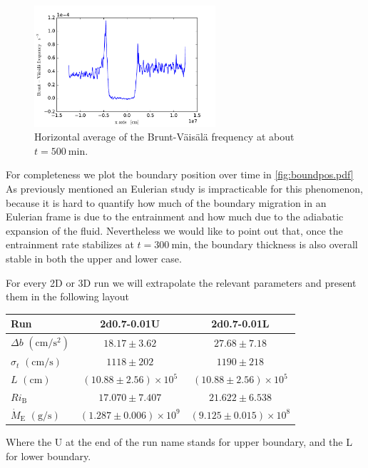  \begin{figure}[t!]
\centering
\includegraphics[width=0.6\textwidth]{./img/brunt}
\caption{Horizontal average of the Brunt-Väisälä frequency at about $t=500 \ \mathrm{min}$.}
\label{fig:brunt}
\centering
\end{figure}
For completeness we plot the boundary position over time in \ref{fig:boundpos.pdf} As previously mentioned an Eulerian study is impracticable for this phenomenon, because it is hard to quantify how much of the boundary migration in an Eulerian frame is due to the entrainment and how much due to the adiabatic expansion of the fluid. Nevertheless we would like to point out that, once the entrainment rate stabilizes at $t=300 \ \mathrm{min}$, the boundary thickness is also overall stable in both the upper and lower case. 

For every 2D or 3D run we will extrapolate the relevant parameters and present them in the following layout
\begin{center}
 \begin{tabular}{l|c|c}
	 Run &2d0.7-0.01U&2d0.7-0.01L\\
	  	\hline
	   $\Delta b$ $(\mathrm{cm/s^{2}})$&$ 18.17 \pm 3.62 $&$27.68 \pm 7.18$\\
		\hline
	   $\sigma_t$ $(\mathrm{cm/s})$ &$ 1118 \pm 202 $&$1190 \pm 218$\\
		\hline
	   $L$ $(\mathrm{cm})$&$(10.88 \pm 2.56) \times 10^5$&$(10.88 \pm 2.56) \times 10^5$\\
		\hline
	   $Ri_{\mathrm{B}}$& $17.070 \pm 7.407 $&$21.622 \pm 6.538$\\
		\hline
	   $\dot{M}_{\mathrm{E}}$ $(\mathrm{g/s})$ &$(1.287 \pm 0.006) \times 10^9$&$(9.125 \pm 0.015) \times 10^8$\\
      \end{tabular}
 \end{center}
 Where the U at the end of the run name stands for upper boundary, and the L for lower boundary. 
 
